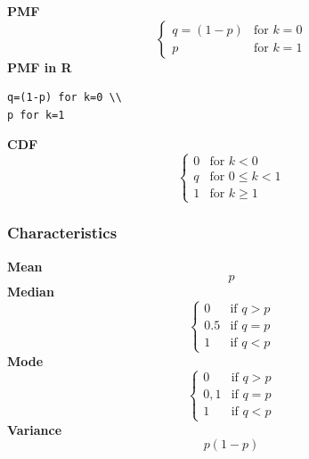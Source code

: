 \smallskip \noindent \hspace{.2cm} \textbf{PMF} 
\begin{equation*}\begin{cases}
    q=(1-p) & \text{for }k=0 \\ p & \text{for }k=1
    \end{cases}\end{equation*}
\smallskip \noindent \hspace{.2cm} \textbf{PMF in R}  
\begin{verbatim}q=(1-p) for k=0 \\
p for k=1\end{verbatim}
\smallskip \noindent \hspace{.2cm} \textbf{CDF} 
\begin{equation*}\begin{cases}
    0 & \text{for }k<0 \\ q & \text{for }0\leq k<1 \\ 1 & \text{for }k\geq 1
    \end{cases}\end{equation*}
\smallskip
\subsubsection*{Characteristics}
\smallskip \noindent \hspace{.2cm} \textbf{Mean} 
\begin{equation*}p\end{equation*}
\smallskip \noindent \hspace{.2cm} \textbf{Median} 
\begin{equation*}\begin{cases}
0 & \text{if } q > p\\
0.5 & \text{if } q=p\\
1 & \text{if } q<p
\end{cases}\end{equation*}
\smallskip \noindent \hspace{.2cm} \textbf{Mode} 
\begin{equation*}\begin{cases}
0 & \text{if } q > p\\
0, 1 & \text{if } q=p\\
1 & \text{if } q < p
\end{cases}\end{equation*}
\smallskip \noindent \hspace{.2cm} \textbf{Variance} 
\begin{equation*}p(1-p)\end{equation*}
\smallskip
